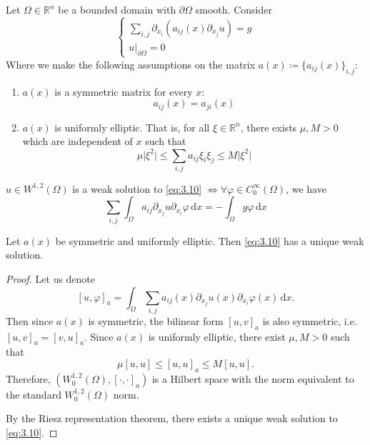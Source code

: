 \documentclass{report}
\begin{document}
\begin{example}{}{}
    Let \(\Omega \in \mathbb{R}^{n}\) be a bounded domain with \(\partial \Omega\) smooth. Consider
    \begin{equation}\label{eq:3.10}
        \begin{cases}
            \sum_{i, j} \partial_{x_{i}}(a_{ij}(x)\partial_{x_{j}}u) = g \\
            \left. u \right|_{\partial \Omega} = 0
        \end{cases}
    \end{equation}
    Where we make the following assumptions on the matrix \(a(x) \coloneqq \{a_{ij}(x)\}_{i,j}\):
    \begin{enumerate}
        \item \(a(x)\) is a symmetric matrix for every \(x\): 
        \[a_{ij}(x) = a_{ji}(x)\]
        \item \(a(x)\) is uniformly elliptic. That is, for all \(\xi \in \mathbb{R}^{n}\), there exists \(\mu, M > 0\) which are independent of \(x\) such that
        \[
            \mu \vert \xi^{2} \vert \leq \sum_{i,j} a_{ij} \xi_{i} \xi_{j} \leq M \vert \xi^{2} \vert 
        \]
    \end{enumerate} 
\end{example}

\begin{definition}{}{}
    \(u \in W^{1, 2}(\Omega)\) is a weak solution to \ref{eq:3.10} \(\iff \forall \varphi \in C^{\infty}_{0}(\Omega)\), we have 
    \[
        \sum_{i,j} \int_{\Omega} a_{ij} \partial_{x_{j}} u \partial_{x_{i}} \varphi \,\mathrm{d}x = -\int_{\Omega} g\varphi \,\mathrm{d}x
    \]
\end{definition}

\begin{theorem}{}{}
    Let \(a(x)\) be symmetric and uniformly elliptic. Then \ref{eq:3.10} has a unique weak solution.
\end{theorem}

\begin{proof}
    Let us denote
    \[
        [u, \varphi]_{a} = \int_{\Omega} \sum_{i,j} a_{ij}(x) \partial_{x_{j}} u(x) \partial_{x_{i}} \varphi(x) \,\mathrm{d}x.
    \]
    Then since \(a(x)\) is symmetric, the bilinear form \([u, v]_{a}\) is also symmetric, i.e. \([u, v]_{a} = [v, u]_{a}\). Since \(a(x)\) is uniformly elliptic, there exist \(\mu, M > 0\) such that
    \[
        \mu[u, u] \leq [u, u]_{a} \leq M[u, u].
    \]
    Therefore, \(\left(W^{1, 2}_{0}(\Omega), [\cdot, \cdot]_{a}\right)\) is a Hilbert space with the norm equivalent to the standard \(W^{1, 2}_{0}(\Omega)\) norm.

    By the Riesz representation theorem, there exists a unique weak solution to \ref{eq:3.10}.
\end{proof}
\end{document}
